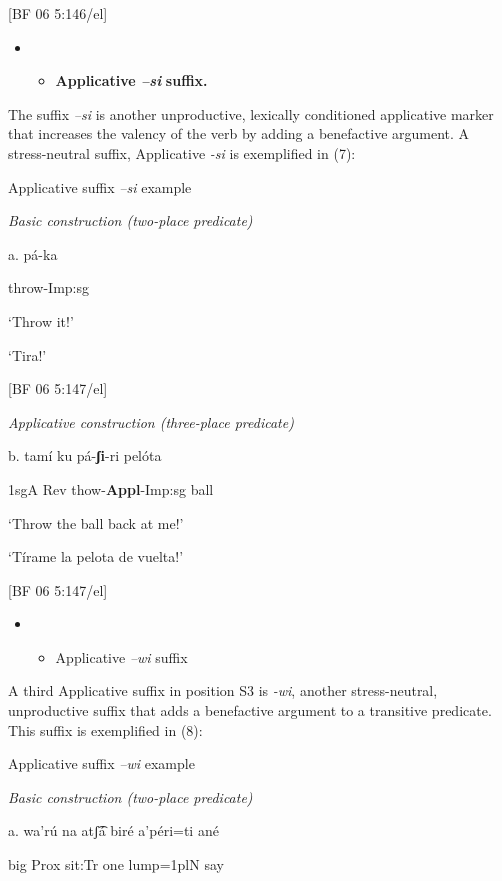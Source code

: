 [BF 06 5:146/el]

\begin{itemize}
\item \begin{itemize}
\item \textbf{Applicative \textit{–si} }\textbf{suffix.}
\end{itemize}
\end{itemize}

The suffix \textit{–si} is another unproductive, lexically conditioned applicative marker that increases the valency of the verb by adding a benefactive argument. A stress-neutral suffix, Applicative \textit{{}-si} is exemplified in (7):

   Applicative suffix \textit{–si} example

    \textit{Basic construction (two-place predicate)}

a.   pá-ka

  throw-Imp:sg

  ‘Throw it!’

‘Tira!’              

[BF 06 5:147/el]

  \textit{Applicative construction (three-place predicate)}

b.   tamí   ku   pá-\textbf{ʃi}{}-ri     pelóta

1sgA  Rev  thow-\textbf{Appl}{}-Imp:sg  ball

‘Throw the ball back at me!’

‘Tírame la pelota de vuelta!’        

[BF 06 5:147/el]

\begin{itemize}
\item \begin{itemize}
\item 
Applicative \textit{–wi} suffix
\end{itemize}
\end{itemize}

{A third Applicative suffix in position S3 is} {\textit{{}-wi}}{, another stress-neutral, unproductive suffix that adds a benefactive argument to a transitive predicate. This suffix is exemplified in (8):}


   Applicative suffix \textit{–wi} example

  \textit{Basic construction (two-place predicate)}

a.   wa’rú   na   atʃ͡á   biré   a’péri=ti   ané    

    big   Prox   sit:Tr   one  lump=1plN  say


